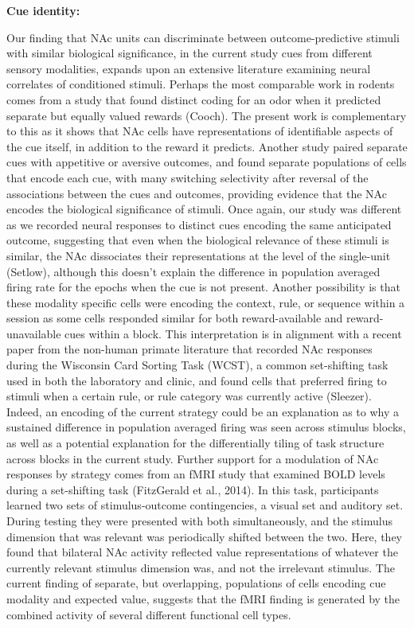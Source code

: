 \documentclass[11pt]{article}
\begin{document}
{{\bf Cue identity:}

Our finding that NAc units can discriminate between outcome-predictive stimuli
with similar biological significance, in the current study cues from different
sensory modalities, expands upon an extensive literature examining neural
correlates of conditioned stimuli. Perhaps the most comparable work in rodents
comes from a study that found distinct coding for an odor when it predicted
separate but equally valued rewards (Cooch). The present work is complementary
to this as it shows that NAc cells have representations of identifiable aspects
of the cue itself, in addition to the reward it predicts. Another study paired
separate cues with appetitive or aversive outcomes, and found separate
populations of cells that encode each cue, with many switching selectivity after
reversal of the associations between the cues and outcomes, providing evidence
that the NAc encodes the biological significance of stimuli. Once again, our
study was different as we recorded neural responses to distinct cues encoding
the same anticipated outcome, suggesting that even when the biological relevance
of these stimuli is similar, the NAc dissociates their representations at the
level of the single-unit (Setlow), although this doesn’t explain the difference
in population averaged firing rate for the epochs when the cue is not
present. Another possibility is that these modality specific cells were encoding
the context, rule, or sequence within a session as some cells responded similar
for both reward-available and reward-unavailable cues within a block. This
interpretation is in alignment with a recent paper from the non-human primate
literature that recorded NAc responses during the Wisconsin Card Sorting Task
(WCST), a common set-shifting task used in both the laboratory and clinic, and
found cells that preferred firing to stimuli when a certain rule, or rule
category was currently active (Sleezer). Indeed, an encoding of the current
strategy could be an explanation as to why a sustained difference in population
averaged firing was seen across stimulus blocks, as well as a potential
explanation for the differentially tiling of task structure across blocks in the
current study. Further support for a modulation of NAc responses by strategy
comes from an fMRI study that examined BOLD levels during a set-shifting task
(FitzGerald et al., 2014). In this task, participants learned two sets of
stimulus-outcome contingencies, a visual set and auditory set. During testing
they were presented with both simultaneously, and the stimulus dimension that
was relevant was periodically shifted between the two. Here, they found that
bilateral NAc activity reflected value representations of whatever the currently
relevant stimulus dimension was, and not the irrelevant stimulus. The current
finding of separate, but overlapping, populations of cells encoding cue modality
and expected value, suggests that the fMRI finding is generated by the combined
activity of several different functional cell types.

}
\end{document}
